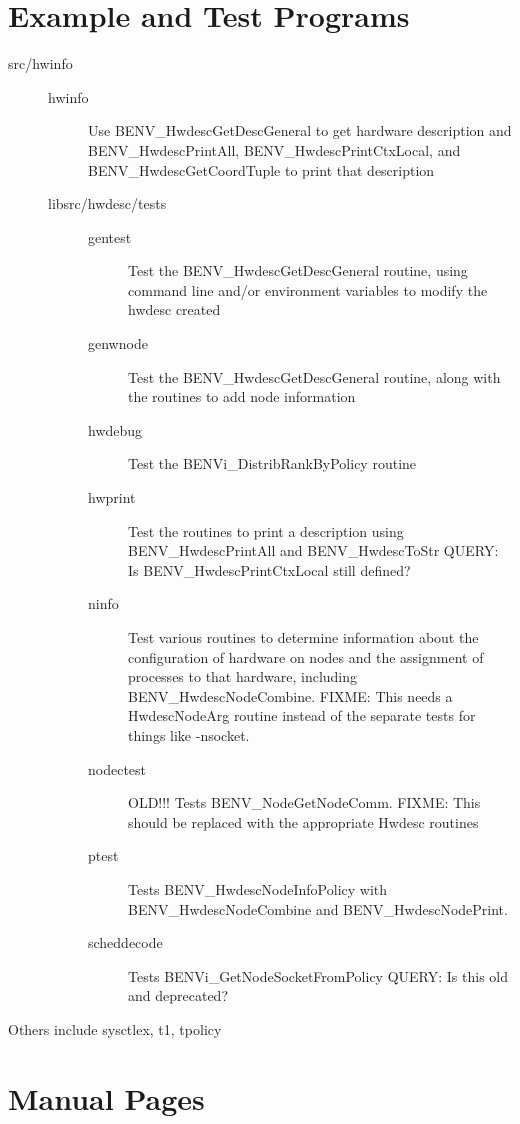 \documentclass[11pt,letterpaper]{report}
\begin{document}
\chapter{Example and Test Programs}
\begin{description}
\item[src/hwinfo]
\begin{description}
\item[hwinfo]Use BENV\_HwdescGetDescGeneral to get hardware
	description and BENV\_HwdescPrintAll, BENV\_HwdescPrintCtxLocal,
	and BENV\_HwdescGetCoordTuple to print that description
\item[libsrc/hwdesc/tests]
\begin{description}
\item[gentest]Test the BENV\_HwdescGetDescGeneral routine, using
	command line and/or environment variables to modify the hwdesc
	created
\item[genwnode]Test the BENV\_HwdescGetDescGeneral routine, along
	with the routines to add node information
\item[hwdebug]Test the BENVi\_DistribRankByPolicy routine
\item[hwprint]Test the routines to print a description using
	BENV\_HwdescPrintAll and BENV\_HwdescToStr
	QUERY: Is BENV\_HwdescPrintCtxLocal still defined?
\item[ninfo]Test various routines to determine information about
	the configuration of hardware on nodes and the assignment of
	processes to that hardware, including BENV\_HwdescNodeCombine.
	FIXME: This needs a HwdescNodeArg routine instead of the
	separate tests for things like -nsocket.
\item[nodectest]OLD!!! Tests BENV\_NodeGetNodeComm.
	FIXME: This should be replaced with the appropriate Hwdesc
	routines
\item[ptest]Tests BENV\_HwdescNodeInfoPolicy with
	BENV\_HwdescNodeCombine and BENV\_HwdescNodePrint.
\item[scheddecode]Tests BENVi\_GetNodeSocketFromPolicy
	QUERY: Is this old and deprecated?
\end{description}
\end{description}
\end{description}
	Others include sysctlex, t1, tpolicy

\chapter{Manual Pages}
\end{document}
